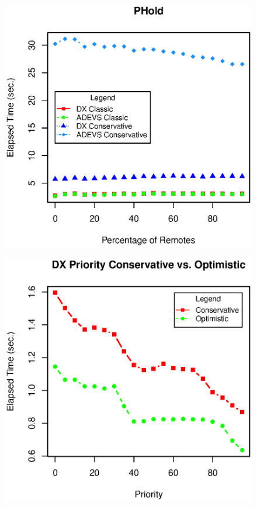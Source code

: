 \documentclass{scs}
\begin{document}
\begin{figure}[h]
	\includegraphics[width=.5\textwidth]{fig/fig5.eps}
	\label{fig5.eps}
\end{figure}

\begin{figure}[h]
	\includegraphics[width=.5\textwidth]{fig/fig6.eps}
	\label{fig6.eps}
\end{figure}
\end{document}
